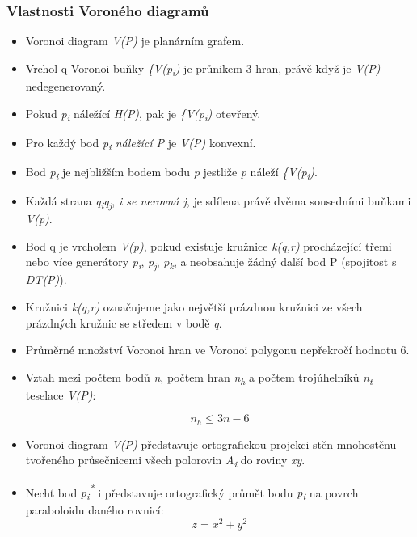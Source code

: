 \subsubsection{Vlastnosti Voroného diagramů}

\begin{itemize}
\item Voronoi diagram \textit{V(P)} je planárním grafem.
\item Vrchol q Voronoi buňky \textit{\{V(p\textsubscript{i})} je průnikem 3 hran, právě když je \textit{V(P)} nedegenerovaný.
\item Pokud \textit{p\textsubscript{i}} náležící \textit{H(P)}, pak je \textit{\{V(p\textsubscript{i})}  otevřený. 
\item Pro každý bod \textit{p\textsubscript{i} náležící P} je \textit{V(P)} konvexní. 
\item Bod \textit{p\textsubscript{i}} je nejbližším bodem bodu \textit{p}
jestliže \textit{p} náleží \textit{\{V(p\textsubscript{i})}.
\item Každá strana \textit{q\textsubscript{i}q\textsubscript{j}}, \textit{i se nerovná j},
je sdílena právě dvěma sousedními buňkami \textit{V(p)}. 
\item Bod q je vrcholem \textit{V(p)}, pokud existuje kružnice \textit{k(q,r)} procházející třemi
nebo více generátory \textit{p\textsubscript{i}}, \textit{p\textsubscript{j}},
\textit{p\textsubscript{k}}, a neobsahuje žádný další bod P (spojitost s \textit{DT(P)}). 
\item Kružnici \textit{k(q,r)} označujeme jako největší prázdnou kružnici ze všech prázdných kružnic se středem v bodě \textit{q}. 
\item Průměrné množství Voronoi hran ve Voronoi polygonu nepřekročí hodnotu 6. 
\item Vztah mezi počtem bodů \textit{n}, počtem hran \textit{n\textsubscript{h}}
a počtem trojúhelníků \textit{n\textsubscript{t}} teselace \textit{V(P)}:

\[ n_h \leq 3n-6\]

\item Voronoi diagram \textit{V(P)} představuje ortografickou projekci stěn
mnohostěnu tvořeného průsečnicemi všech polorovin \textit{A\textsubscript{i}} do roviny \textit{xy}. 
\item Nechť bod \textit{p\textsubscript{i}\textsuperscript{*}} i představuje
ortografický průmět bodu \textit{p\textsubscript{i}} na povrch paraboloidu daného rovnicí:
\[ z = x^2 + y^2 \]
   
\end{itemize} 


